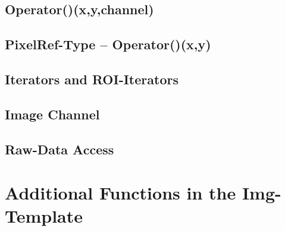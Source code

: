 \subsection{Operator()(x,y,channel)}


\subsection{PixelRef-Type -- Operator()(x,y)}


\subsection{Iterators and ROI-Iterators}


\subsection{Image Channel }


\subsection{Raw-Data Access}



\section{Additional Functions in the Img-Template}






